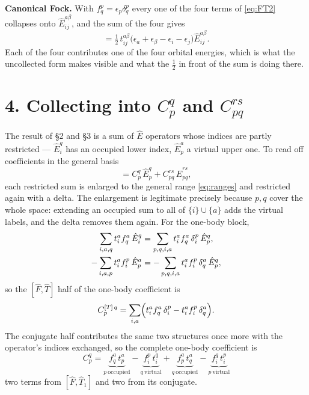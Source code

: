 \documentclass[11pt]{article}
\newcommand{\E}[2]{\hat E^{#1}_{#2}}
\newcommand{\occ}{i}
\newcommand{\vir}{a}
\begin{document}
\noindent\textbf{Canonical Fock.} With $f^p_q=\epsilon_p\delta^p_q$ every one of
the four terms of \eqref{eq:FT2} collapses onto $\E{\vir\beta}{\occ j}$, and the
sum of the four gives
\begin{equation}
  [\hat F,\hat T_2]
   =\tfrac12\,t^{\vir\beta}_{\occ j}
     \bigl(\epsilon_\vir+\epsilon_\beta-\epsilon_\occ-\epsilon_j\bigr)
     \E{\vir\beta}{\occ j}.
  \label{eq:FT2canon}
\end{equation}
Each of the four contributes one of the four orbital energies, which is what
the uncollected form makes visible and what the $\tfrac12$ in front of the sum
is doing there.

\section*{4. Collecting into \texorpdfstring{$C^q_p$}{Cqp} and
\texorpdfstring{$C^{rs}_{pq}$}{Crs pq}}

The result of \S2 and \S3 is a sum of $\hat E$ operators whose indices are
partly restricted --- $\E{q}{\occ}$ has an occupied lower index,
$\E{\vir}{p}$ a virtual upper one. To read off coefficients in the general
basis
\begin{equation}
  [\hat F,\hat A]=C^q_p\,\E{q}{p}+C^{rs}_{pq}\,\E{rs}{pq},
  \label{eq:Cform}
\end{equation}
each restricted sum is enlarged to the general range \eqref{eq:ranges} and
restricted again with a delta. The enlargement is legitimate precisely because
$p,q$ cover the whole space: extending an occupied sum to all of
$\{\occ\}\cup\{\vir\}$ adds the virtual labels, and the delta removes them
again. For the one-body block,
\begin{align}
  \sum_{\occ,\vir,q}t^\vir_\occ f^\vir_q\,\E{q}{\occ}
   &=\sum_{p,q,\occ,\vir}t^\vir_\occ f^\vir_q\,\delta^p_\occ\,\E{q}{p},\notag\\
  -\sum_{\occ,\vir,p}t^\vir_\occ f^p_\occ\,\E{\vir}{p}
   &=-\sum_{p,q,\occ,\vir}t^\vir_\occ f^p_\occ\,\delta^\vir_q\,\E{q}{p},
  \label{eq:enlarge1}
\end{align}
so the $[\hat F,\hat T]$ half of the one-body coefficient is
\begin{equation}
  C^{[T]\,q}_p=\sum_{\occ,\vir}\Bigl(t^\vir_\occ f^\vir_q\,\delta^p_\occ
   -t^\vir_\occ f^p_\occ\,\delta^\vir_q\Bigr).
  \label{eq:C1}
\end{equation}
The conjugate half contributes the same two structures once more with the
operator's indices exchanged, so the complete one-body coefficient is
\begin{equation}
  \boxed{\;C^q_p=
    \underbrace{f^\vir_q\,t^\vir_p}_{p\ \text{occupied}}
   -\underbrace{f^p_\occ\,t^q_\occ}_{q\ \text{virtual}}
   +\underbrace{f^\vir_p\,t^\vir_q}_{q\ \text{occupied}}
   -\underbrace{f^q_\occ\,t^p_\occ}_{p\ \text{virtual}}\;}
  \label{eq:C1result}
\end{equation}
two terms from $[\hat F,\hat T_1]$ and two from its conjugate.
\end{document}
